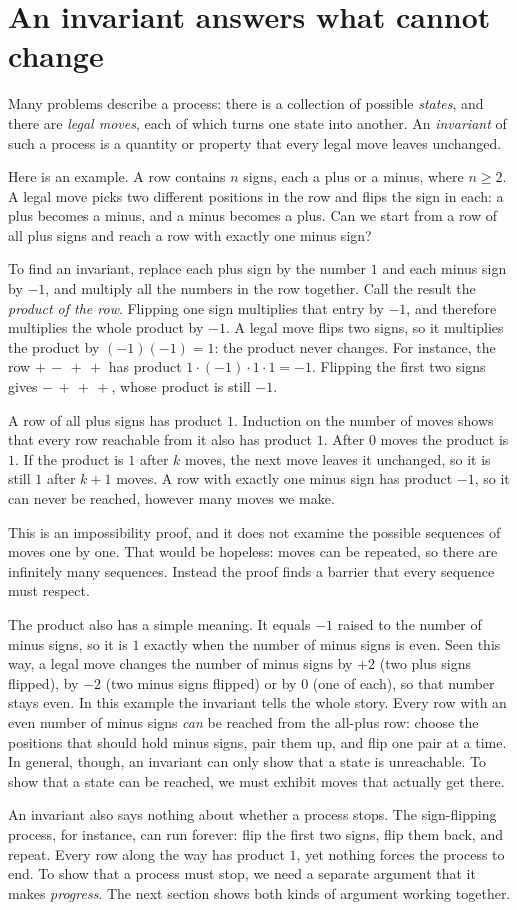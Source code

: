 \section{An invariant answers what cannot change}\label{ch05:sec:invariant}
Many problems describe a process: there is a collection of possible \emph{states}, and there are \emph{legal moves}, each of which turns one state into another. An \emph{invariant} of such a process is a quantity or property that every legal move leaves unchanged.

Here is an example. A row contains $n$ signs, each a plus or a minus, where $n\ge2$. A legal move picks two different positions in the row and flips the sign in each: a plus becomes a minus, and a minus becomes a plus. Can we start from a row of all plus signs and reach a row with exactly one minus sign?

To find an invariant, replace each plus sign by the number $1$ and each minus sign by $-1$, and multiply all the numbers in the row together. Call the result the \emph{product of the row}. Flipping one sign multiplies that entry by $-1$, and therefore multiplies the whole product by $-1$. A legal move flips two signs, so it multiplies the product by $(-1)(-1)=1$: the product never changes. For instance, the row $+\,-\,+\,+$ has product $1\cdot(-1)\cdot1\cdot1=-1$. Flipping the first two signs gives $-\,+\,+\,+$, whose product is still $-1$.

A row of all plus signs has product $1$. Induction on the number of moves shows that every row reachable from it also has product $1$. After $0$ moves the product is $1$. If the product is $1$ after $k$ moves, the next move leaves it unchanged, so it is still $1$ after $k+1$ moves. A row with exactly one minus sign has product $-1$, so it can never be reached, however many moves we make.

This is an impossibility proof, and it does not examine the possible sequences of moves one by one. That would be hopeless: moves can be repeated, so there are infinitely many sequences. Instead the proof finds a barrier that every sequence must respect.

The product also has a simple meaning. It equals $-1$ raised to the number of minus signs, so it is $1$ exactly when the number of minus signs is even. Seen this way, a legal move changes the number of minus signs by $+2$ (two plus signs flipped), by $-2$ (two minus signs flipped) or by $0$ (one of each), so that number stays even. In this example the invariant tells the whole story. Every row with an even number of minus signs \emph{can} be reached from the all-plus row: choose the positions that should hold minus signs, pair them up, and flip one pair at a time. In general, though, an invariant can only show that a state is unreachable. To show that a state can be reached, we must exhibit moves that actually get there.

An invariant also says nothing about whether a process stops. The sign-flipping process, for instance, can run forever: flip the first two signs, flip them back, and repeat. Every row along the way has product $1$, yet nothing forces the process to end. To show that a process must stop, we need a separate argument that it makes \emph{progress}. The next section shows both kinds of argument working together.
